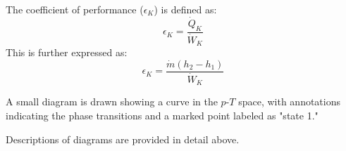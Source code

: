 The coefficient of performance (\(\epsilon_K\)) is defined as:  
\[
\epsilon_K = \frac{\dot{Q}_K}{\dot{W}_K}
\]  
This is further expressed as:  
\[
\epsilon_K = \frac{\dot{m} (h_2 - h_1)}{\dot{W}_K}
\]  

A small diagram is drawn showing a curve in the \(p\)-\(T\) space, with annotations indicating the phase transitions and a marked point labeled as "state 1."  

Descriptions of diagrams are provided in detail above.